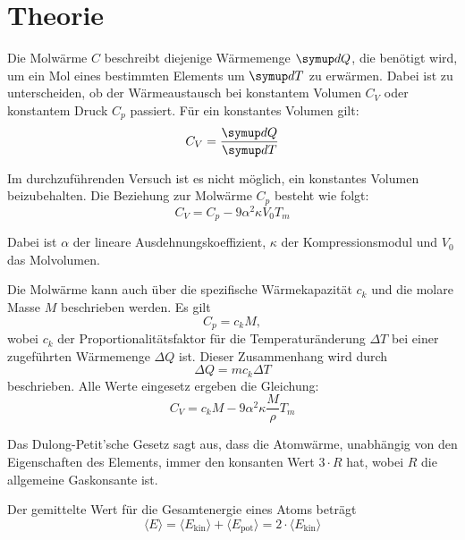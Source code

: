 \section{Theorie}
\label{sec:Theorie}


Die Molwärme $C$ beschreibt diejenige Wärmemenge $\symup dQ$, die benötigt wird, um ein Mol eines bestimmten Elements um 
$\symup dT$ zu erwärmen. Dabei ist zu unterscheiden, ob der Wärmeaustausch bei konstantem Volumen $C_V$ oder konstantem Druck $C_p$
passiert. Für ein konstantes Volumen gilt:
\begin{equation}
    C_V = \frac{\symup dQ}{\symup dT} 
\end{equation}

Im durchzuführenden Versuch ist es nicht möglich, ein konstantes Volumen beizubehalten. Die Beziehung zur Molwärme $C_p$ besteht wie 
folgt:
\begin{equation}
    C_V = C_p - 9 \alpha^2 \kappa V_0 T_m 
\end{equation}

Dabei ist $\alpha$ der lineare Ausdehnungskoeffizient, $\kappa$ der Kompressionsmodul und $V_0$ das Molvolumen.

Die Molwärme kann auch über die spezifische Wärmekapazität $c_k$ und die molare Masse $M$ beschrieben werden. Es gilt 
\begin{equation}
    C_p = c_k M, 
\end{equation}
wobei $c_k$ der Proportionalitätsfaktor für die Temperaturänderung $\Delta T$ bei einer zugeführten Wärmemenge $\Delta Q$ ist. 
Dieser Zusammenhang wird durch 
\begin{equation}
    \Delta Q = m c_k \Delta T
\end{equation}
beschrieben.
Alle Werte eingesetz ergeben die Gleichung:
\begin{equation}
   C_V = c_k M - 9 \alpha^2 \kappa \frac{M}{\rho} T_m 
   \label{eqn:C_V}
\end{equation}


Das Dulong-Petit'sche Gesetz sagt aus, dass die Atomwärme, unabhängig von den Eigenschaften des Elements, immer den
konsanten Wert $3\cdot R$ hat, wobei $R$ die allgemeine Gaskonsante ist. 

Der gemittelte Wert für die Gesamtenergie eines Atoms beträgt 
\begin{equation}
    \langle E \rangle = \langle E_\text{kin} \rangle + \langle E_\text{pot} \rangle = 2\cdot \langle E_\text{kin} \rangle
\end{equation}

